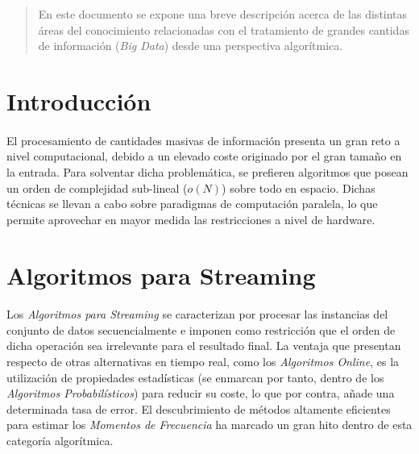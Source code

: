 \documentclass[a4paper]{article}
\begin{document}
  \maketitle %



  	\begin{abstract}
  		\noindent En este documento se expone una breve descripción acerca de las distintas áreas del conocimiento relacionadas con el tratamiento de grandes cantidas de información (\emph{Big Data}) desde una perspectiva algorítmica.
  	\end{abstract}


  \section{Introducción}

    \paragraph{}
    El procesamiento de cantidades masivas de información presenta un gran reto a nivel computacional, debido a un elevado coste originado por el gran tamaño en la entrada. Para solventar dicha problemática, se prefieren algoritmos que posean un orden de complejidad sub-lineal ($o(N)$) sobre todo en espacio. Dichas técnicas se llevan a cabo sobre paradigmas de computación paralela, lo que permite aprovechar en mayor medida las restricciones a nivel de hardware.

  \section{Algoritmos para Streaming}

    \paragraph{}
    Los \emph{Algoritmos para Streaming} se caracterizan por procesar las instancias del conjunto de datos secuencialmente e imponen como restricción que el orden de dicha operación sea irrelevante para el resultado final. La ventaja que presentan respecto de otras alternativas en tiempo real, como los \emph{Algoritmos Online}, es la utilización de propiedades estadísticas (se enmarcan por tanto, dentro de los \emph{Algoritmos Probabilísticos}) para reducir su coste, lo que por contra, añade una determinada tasa de error. El descubrimiento de métodos altamente eficientes para estimar los \emph{Momentos de Frecuencia} ha marcado un gran hito dentro de esta categoría algorítmica.
\end{document}
